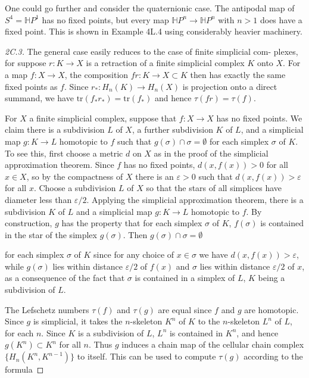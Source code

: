 One could go further and consider the quaternionic case. The antipodal map of
$S^4 = \mathbb{H}P^1$ has no fixed points, but every map $\mathbb{H}P^n \to \mathbb{H}P^n$ with $n > 1$ does have a
fixed point. This is shown in Example 4L.4 using considerably heavier machinery.
\begin{proof}[2C.3]
 The general case easily reduces to the case of finite simplicial com-
plexes, for suppose $r: K \to X$ is a retraction of a finite simplicial complex $K$ onto $X$.
For a map $f: X \to X$, the composition $fr: K \to X \subset K$ then has exactly the same fixed
points as $f$. Since $r_*: H_n(K) \to H_n(X)$ is projection onto a direct summand, we have
$\text{tr}(f_* r_*) = \text{tr}(f_*)$ and hence $\tau(fr) = \tau(f)$.

For $X$ a finite simplicial complex, suppose that $f: X \to X$ has no fixed points. We
claim there is a subdivision $L$ of $X$, a further subdivision $K$ of $L$, and a simplicial map
$g: K \to L$ homotopic to $f$ such that $g(\sigma) \cap \sigma = \emptyset$ for each simplex $\sigma$ of $K$. To see this,
first choose a metric $d$ on $X$ as in the proof of the simplicial approximation theorem.
Since $f$ has no fixed points, $d(x, f(x)) > 0$ for all $x \in X$, so by the compactness
of $X$ there is an $\varepsilon > 0$ such that $d(x, f(x)) > \varepsilon$ for all $x$. Choose a subdivision
$L$ of $X$ so that the stars of all simplices have diameter less than $\varepsilon/2$. Applying the
simplicial approximation theorem, there is a subdivision $K$ of $L$ and a simplicial map
$g: K \to L$ homotopic to $f$. By construction, $g$ has the property that for each simplex
$\sigma$ of $K$, $f(\sigma)$ is contained in the star of the simplex $g(\sigma)$. Then $g(\sigma) \cap \sigma = \emptyset$

for each simplex $\sigma$ of $K$ since for any choice of $x \in \sigma$ we have $d(x, f(x)) > \varepsilon$,
while $g(\sigma)$ lies within distance $\varepsilon/2$ of $f(x)$ and $\sigma$ lies within distance $\varepsilon/2$ of $x$, as
a consequence of the fact that $\sigma$ is contained in a simplex of $L$, $K$ being a subdivision
of $L$.

The Lefschetz numbers $\tau(f)$ and $\tau(g)$ are equal since $f$ and $g$ are homotopic.
Since $g$ is simplicial, it takes the $n$-skeleton $K^n$ of $K$ to the $n$-skeleton $L^n$ of $L$, for
each $n$. Since $K$ is a subdivision of $L$, $L^n$ is contained in $K^n$, and hence $g(K^n) \subset K^n$
for all $n$. Thus $g$ induces a chain map of the cellular chain complex $\{H_n(K^n, K^{n-1})\}$
to itself. This can be used to compute $\tau(g)$ according to the formula


\end{proof}
